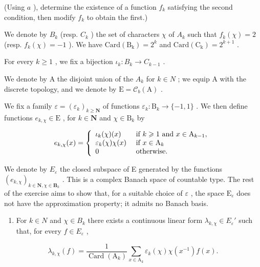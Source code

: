 (Using \(a\) ), determine the existence of a function \(f_{k}\) satisfying the second condition, then modify \(f_{k}\) to obtain the first.)

We denote by \(B_{k}\) (resp. \(C_{k}\) ) the set of characters \(\chi\) of \(A_{k}\) such that \(f_{k}(\chi)=2\) (resp. \(f_{k}(\chi)=-1\) ). We have \(\mathrm{Card(B_{k})}=2^{k}\) and \(\mathrm{Card(C_{k})}=2^{k+1}\) .

For every \(k \geqslant 1\) , we fix a bijection \(\iota_k \colon B_k \to C_{k-1}\) .

We denote by A the disjoint union of the \(A_{k}\) for \(k \in N\) ; we equip A with the discrete topology, and we denote by \(\mathrm{E} = \mathcal{C}_{b}(\mathrm{A})\) .

We fix a family \(\varepsilon = (\varepsilon_k)_{k\geqslant \mathbf{N}}\) of functions \(\varepsilon_{k}\colon \mathrm{B}_{k}\to \{-1,1\}\) . We then define functions \(e_{k,\chi}\in \mathrm{E}\) , for \(k\in \mathbf{N}\) and \(\chi \in \mathrm{B}_k\) by

\[
e _ {k, \chi} (x) = \left\{ \begin{array}{l l} \iota_ {k} (\chi) (x) & \text { if } k \geqslant 1 \text {   and   } x \in \mathrm{A} _ {k - 1}, \\ \varepsilon_ {k} (\chi) \chi (x) & \text { if } x \in \mathrm{A} _ {k} \\ 0 & \text { otherwise. } \end{array} \right.
\]

We denote by \(E_{\varepsilon}\) the closed subspace of E generated by the functions \((e_{k,\chi})_{k\in\mathbf{N},\chi\in\mathbf{B}_{k}}\) . This is a complex Banach space of countable type. The rest of the exercise aims to show that, for a suitable choice of \(\varepsilon\) , the space \(\mathrm{E}_{\varepsilon}\) does not have the approximation property; it admits no Banach basis.

\begin{enumerate}
\def\labelenumi{\alph{enumi})}
\setcounter{enumi}{2}
\tightlist
\item
  For \(k \in N\) and \(\chi \in B_{k}\) there exists a continuous linear form \(\lambda_{k,\chi} \in E_{\varepsilon}'\) such that, for every \(f \in E_{\varepsilon}\) ,
\end{enumerate}

\[
\lambda_ {k, \chi} (f) = \frac {1}{\operatorname{Card} (\mathrm{A} _ {k})} \sum_ {x \in \mathrm{A} _ {k}} \varepsilon_ {k} (\chi) \chi (x ^ {- 1}) f (x).
\]

